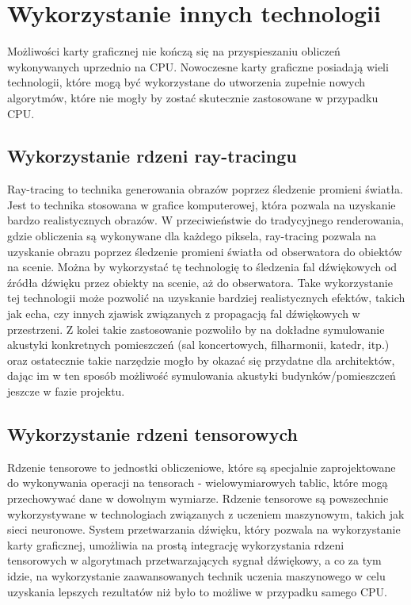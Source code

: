 \clearpage
\section{Wykorzystanie innych technologii}
Możliwości karty graficznej nie kończą się na przyspieszaniu obliczeń wykonywanych uprzednio na CPU. Nowoczesne karty graficzne posiadają wieli technologii, które mogą być wykorzystane do utworzenia zupełnie nowych algorytmów, które nie mogły by zostać skutecznie zastosowane w przypadku CPU.

\subsection{Wykorzystanie rdzeni ray-tracingu}
Ray-tracing\cite{bib:ray-tracing-cores} to technika generowania obrazów poprzez śledzenie promieni światła. Jest to technika stosowana w grafice komputerowej, która pozwala na uzyskanie bardzo realistycznych obrazów. W przeciwieństwie do tradycyjnego renderowania, gdzie obliczenia są wykonywane dla każdego piksela, ray-tracing pozwala na uzyskanie obrazu poprzez śledzenie promieni światła od obserwatora do obiektów na scenie. Można by wykorzystać tę technologię to śledzenia fal dźwiękowych od źródła dźwięku przez obiekty na scenie, aż do obserwatora. Take wykorzystanie tej technologii może pozwolić na uzyskanie bardziej realistycznych efektów, takich jak echa, czy innych zjawisk związanych z propagacją fal dźwiękowych w przestrzeni. Z kolei takie zastosowanie pozwoliło by na dokładne symulowanie akustyki konkretnych pomieszczeń (sal koncertowych, filharmonii, katedr, itp.) oraz ostatecznie takie narzędzie mogło by okazać się przydatne dla architektów, dając im w ten sposób możliwość symulowania akustyki budynków/pomieszczeń jeszcze w fazie projektu.

\subsection{Wykorzystanie rdzeni tensorowych}
Rdzenie tensorowe\cite{bib:tensor-cores} to jednostki obliczeniowe, które są specjalnie zaprojektowane do wykonywania operacji na tensorach - wielowymiarowych tablic, które mogą przechowywać dane w dowolnym wymiarze. Rdzenie tensorowe są powszechnie wykorzystywane w technologiach związanych z uczeniem maszynowym, takich jak sieci neuronowe. System przetwarzania dźwięku, który pozwala na wykorzystanie karty graficznej, umożliwia na prostą integrację wykorzystania rdzeni tensorowych w algorytmach przetwarzających sygnał dźwiękowy, a co za tym idzie, na wykorzystanie zaawansowanych technik uczenia maszynowego w celu uzyskania lepszych rezultatów niż było to możliwe w przypadku samego CPU.

